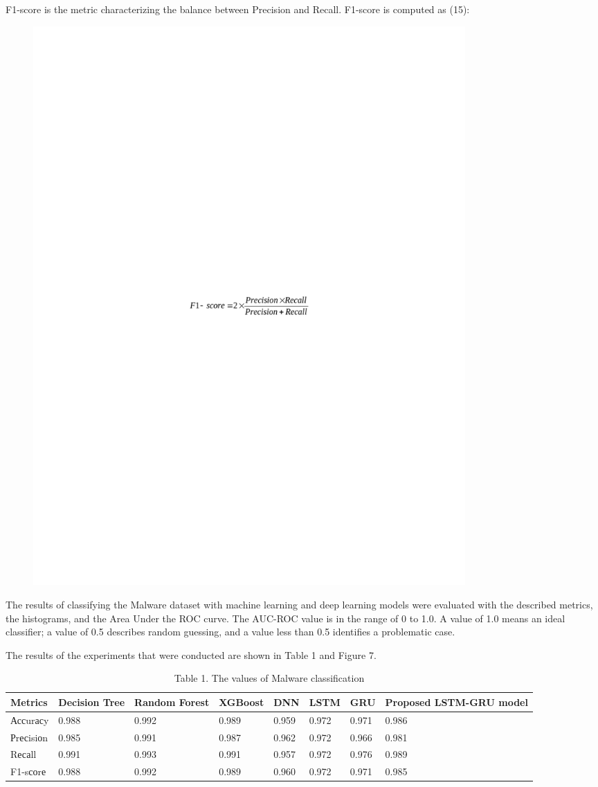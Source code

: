 F1-score is the metric characterizing the balance between Precision and
Recall. F1-score is computed as (15):

\begin{figure}[H]
	\centering
	\includegraphics[width=0.8\textwidth]{media/ict/image84}
	\caption*{}
\end{figure}


The results of classifying the Malware dataset with machine learning and
deep learning models were evaluated with the described metrics, the
histograms, and the Area Under the ROC curve. The AUC-ROC value is in
the range of 0 to 1.0. A value of 1.0 means an ideal classifier; a value
of 0.5 describes random guessing, and a value less than 0.5 identifies a
problematic case.

The results of the experiments that were conducted are shown in Table 1
and Figure 7.

\begin{table}[H]
\caption*{Table 1. The values of Malware classification}
\centering
\begin{tabular}{|l|l|l|l|l|l|l|l|}
\hline
Metrics   & Decision Tree & Random Forest & XGBoost & DNN   & LSTM  & GRU   & \multirow{1}{2cm}{Proposed LSTM-GRU model} \\ \hline
Ассurасy  & 0.988         & 0.992         & 0.989   & 0.959 & 0.972 & 0.971 & 0.986                   \\ \hline
Рrесisiоn & 0.985         & 0.991         & 0.987   & 0.962 & 0.972 & 0.966 & 0.981                   \\ \hline
Rесаll    & 0.991         & 0.993         & 0.991   & 0.957 & 0.972 & 0.976 & 0.989                   \\ \hline
F1-sсоrе  & 0.988         & 0.992         & 0.989   & 0.960 & 0.972 & 0.971 & 0.985                   \\ \hline
\end{tabular}
\end{table}

